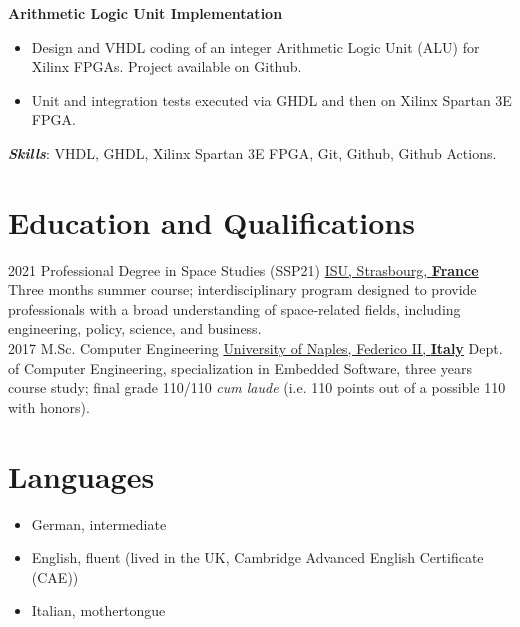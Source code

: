 \documentclass[letterpaper]{twentysecondcv} %
\begin{document}
\textbf{Arithmetic Logic Unit Implementation}

\begin{itemize}
    \item Design and VHDL coding of an integer Arithmetic Logic Unit (ALU) for Xilinx FPGAs. Project available on Github.
    \item Unit and integration tests executed via GHDL and then on Xilinx Spartan 3E FPGA.
\end{itemize}

\textbf{\textit{Skills}}: VHDL, GHDL, Xilinx Spartan 3E FPGA, Git, Github, Github Actions.

\section{Education and Qualifications}
\begin{twenty}
	\twentyitem
        {2021}
    	{}
        {Professional Degree in Space Studies (SSP21)}
        {\href{https://www.isunet.edu/ssp/}{ISU, Strasbourg, \textbf{France}}}
        {}
        {
            Three months summer course; interdisciplinary program designed to provide professionals with a broad understanding of space-related fields, including engineering, policy, science, and business.
        }\\
	\twentyitem
        {2017}
    	{}
        {M.Sc. Computer Engineering}
        {\href{http://www.scuolapsb.unina.it/}{University of Naples, Federico II, \textbf{Italy}}}
        {}
        {
            Dept. of Computer Engineering, specialization in Embedded Software, three years course study; final grade 110/110 \textit{cum laude} (i.e. 110 points out of a possible 110 with honors).
        }
\end{twenty}

\section{Languages}

\begin{itemize}
    \item German, intermediate
    \item English, fluent (lived in the UK, Cambridge Advanced English Certificate (CAE))
    \item Italian, mothertongue
\end{itemize}
\end{document}
